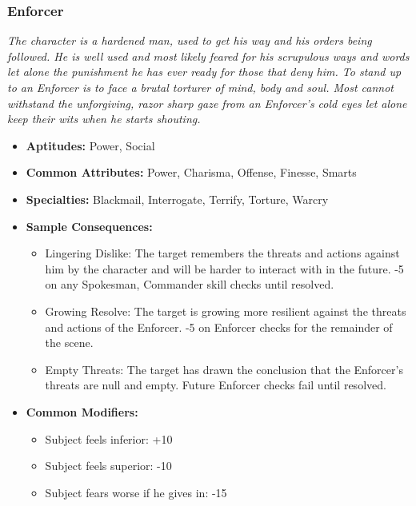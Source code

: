 \subsubsection{Enforcer}\label{Enforcer}
\textit{The character is a hardened man, used to get his way and his orders being followed. 
He is well used and most likely feared for his scrupulous ways and words let alone the punishment he has ever ready for those that deny him.
To stand up to an Enforcer is to face a brutal torturer of mind, body and soul. 
Most cannot withstand the unforgiving, razor sharp gaze from an Enforcer's cold eyes let alone keep their wits when he starts shouting.}
\begin{itemize}
	\item \textbf{Aptitudes:} Power, Social
	\item \textbf{Common Attributes:} Power, Charisma, Offense, Finesse, Smarts
	\item \textbf{Specialties:} Blackmail, Interrogate, Terrify, Torture, Warcry
	\item \textbf{Sample Consequences:} 
	\begin{itemize}
		\item Lingering Dislike: The target remembers the threats and actions against him by the character and will be harder to interact with in the future. -5 on any Spokesman, Commander skill checks until resolved.
		\item Growing Resolve: The target is  growing more resilient against the threats and actions of the Enforcer. -5 on Enforcer checks for the remainder of the scene.
		\item Empty Threats: The target has drawn the conclusion that the Enforcer's threats are null and empty. Future Enforcer checks fail until resolved.
	\end{itemize}
	\item \textbf{Common Modifiers:}
	\begin{itemize}
		\item Subject feels inferior: +10
		\item Subject feels superior: -10
		\item Subject fears worse if he gives in: -15 
	\end{itemize}
\end{itemize}

